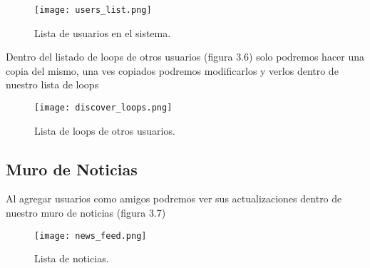 \begin{figure}
  \texttt{[image: users\_list.png]}
  \caption{Lista de usuarios en el sistema.}
  \label{fig:listaloops}
\end{figure}

Dentro del listado de loops de otros usuarios (figura 3.6) solo podremos
hacer una copia del mismo, una ves copiados podremos modificarlos y
verlos dentro de nuestro lista de loops

\begin{figure}
  \texttt{[image: discover\_loops.png]}
  \caption{Lista de loops de otros usuarios.}
  \label{fig:listaloops}
\end{figure}

\subsection{Muro de Noticias}

Al agregar usuarios como amigos podremos ver sus actualizaciones dentro de
nuestro muro de noticias (figura 3.7)

\begin{figure}
  \texttt{[image: news\_feed.png]}
  \caption{Lista de noticias.}
  \label{fig:listaloops}
\end{figure}
